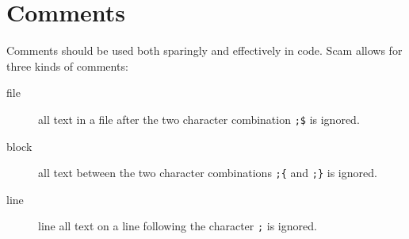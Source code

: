 \chapter{Comments}
\label{Comments}

Comments should be used both sparingly and effectively in code.
Scam allows for three kinds of comments:

\begin{description}
\item[file]
    all text in a file after the
    two character combination \verb!;$! is ignored.
\item[block]
    all text between the
    two character combinations \verb!;{! and \verb!;}! is ignored.
\item[line]
    line all text on a line following the character \verb!;! is ignored.
\end{description}

